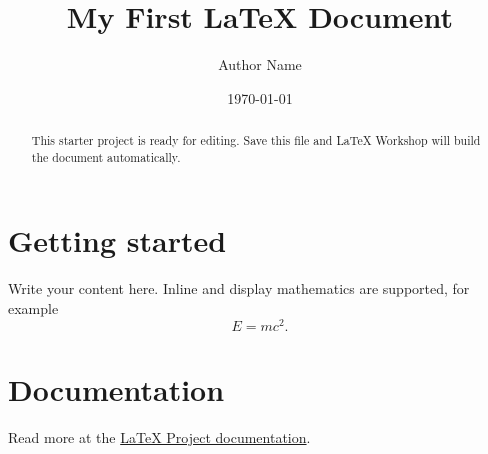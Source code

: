 \documentclass[12pt,a4paper]{article}
\title{My First LaTeX Document}
\author{Author Name}
\date{\today}
\begin{document}
\maketitle

\begin{abstract}
This starter project is ready for editing. Save this file and LaTeX Workshop will build the document automatically.
\end{abstract}

\section{Getting started}

Write your content here. Inline and display mathematics are supported, for example
\[
  E = mc^2.
\]

\section{Documentation}

Read more at the \href{https://www.latex-project.org/help/documentation/}{LaTeX Project documentation}.
\end{document}
